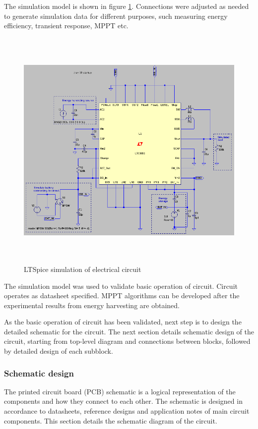 The simulation model is shown in figure \ref{fig:ltspice_sim}. Connections were adjusted as needed to generate simulation data for different purposes, such measuring energy efficiency, transient response, MPPT etc.

\begin{figure}[htb]
\begin{center}
\includegraphics[height=12cm]{images/own_dwg/ltspice_ltc3331.jpg}
\end{center}
\caption{\label{fig:ltspice_sim} LTSpice \cite{ltspice} simulation of electrical circuit}
\end{figure}

The simulation model was used to validate basic operation of circuit. Circuit operates as datasheet specified. MPPT algorithms can be developed after the experimental results from energy harvesting are obtained. 

As the basic operation of circuit has been validated, next step is to design the detailed schematic for the circuit. The next section details schematic design of the circuit, starting from top-level diagram and connections between blocks, followed by detailed design of each subblock. 

\subsubsection{Schematic design}
The printed circuit board (PCB) schematic is a logical representation of the components and how they connect to each other. The schematic is designed in accordance to datasheets, reference designs and application notes of main circuit components. This section details the schematic diagram of the circuit.

